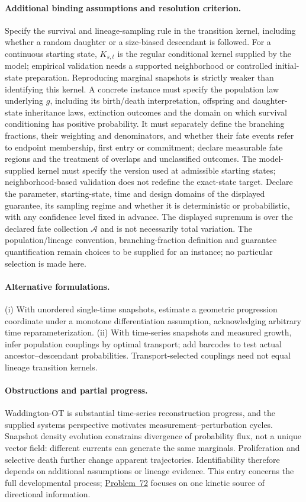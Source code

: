 \documentclass[11pt]{article}
\begin{document}
\paragraph{Additional binding assumptions and resolution criterion.} Specify the survival and lineage-sampling rule in the transition kernel, including whether a random daughter or a size-biased descendant is followed. For a continuous starting state, $K_{s,t}$ is the regular conditional kernel supplied by the model; empirical validation needs a supported neighborhood or controlled initial-state preparation. Reproducing marginal snapshots is strictly weaker than identifying this kernel. A concrete instance must specify the population law underlying $g$, including its birth/death interpretation, offspring and daughter-state inheritance laws, extinction outcomes and the domain on which survival conditioning has positive probability. It must separately define the branching fractions, their weighting and denominators, and whether their fate events refer to endpoint membership, first entry or commitment; declare measurable fate regions and the treatment of overlaps and unclassified outcomes. The model-supplied kernel must specify the version used at admissible starting states; neighborhood-based validation does not redefine the exact-state target. Declare the parameter, starting-state, time and design domains of the displayed guarantee, its sampling regime and whether it is deterministic or probabilistic, with any confidence level fixed in advance. The displayed supremum is over the declared fate collection $\mathcal A$ and is not necessarily total variation. The population/lineage convention, branching-fraction definition and guarantee quantification remain choices to be supplied for an instance; no particular selection is made here.

\paragraph{Alternative formulations.} (i) With unordered single-time snapshots, estimate a geometric progression coordinate under a monotone differentiation assumption, acknowledging arbitrary time reparameterization. (ii) With time-series snapshots and measured growth, infer population couplings by optimal transport; add barcodes to test actual ancestor--descendant probabilities. Transport-selected couplings need not equal lineage transition kernels.
\paragraph{Obstructions and partial progress.} Waddington-OT is substantial time-series reconstruction progress, and the supplied systems perspective motivates measurement--perturbation cycles. Snapshot density evolution constrains divergence of probability flux, not a unique vector field: different currents can generate the same marginals. Proliferation and selective death further change apparent trajectories. Identifiability therefore depends on additional assumptions or lineage evidence. This entry concerns the full developmental process; \href{https://we-solve.github.io/problems/rna-velocity-identifiability-949831b6/}{Problem~72} focuses on one kinetic source of directional information.
\end{document}
